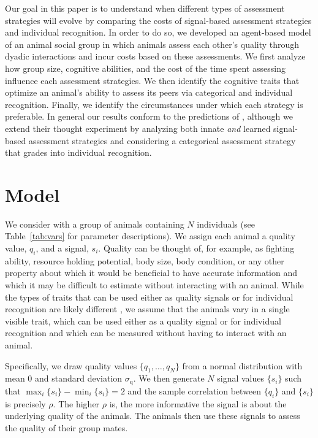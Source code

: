 Our goal in this paper is to understand when different types of assessment strategies will evolve by comparing the costs of signal-based assessment strategies and individual recognition.  In order to do so, we developed an agent-based model of an animal social group in which animals assess each other's quality through dyadic interactions and incur costs based on these assessments. We first analyze how group size, cognitive abilities, and the cost of the time spent assessing influence each assessment strategies. We then identify the cognitive traits that optimize an animal's ability to assess its peers via categorical and individual recognition. Finally, we identify the circumstances under which each strategy is preferable. In general our results conform to the predictions of \citet{sheehan2016evotradeoff}, although we extend their thought experiment by analyzing both innate \emph{and} learned signal-based assessment strategies and considering a categorical assessment strategy that grades into individual recognition. 
 

\section*{Model } 

We consider with a group of animals containing $N$ individuals (see Table~\ref{tab:vars} for parameter descriptions). We assign each animal a quality value, $q_i$, and a signal, $s_i$. Quality can be thought of, for example, as fighting ability, resource holding potential, body size, body condition, or any other property about which it would be beneficial to have accurate information and which it may be difficult to estimate without interacting with an animal. While the types of traits that can be used either as quality signals or for individual recognition are likely different \citep{Dale:2001dv}, we assume that the animals vary in a single visible trait, which can be used either as a quality signal or for individual recognition and which can be measured without having to interact with an animal.  

Specifically, we draw quality values $\{q_1,\dots,q_N\}$ from a normal distribution with mean $0$ and standard deviation $\sigma_\text{q}$. We then generate $N$ signal values $\{s_i\}$ such that 
$\max_i\{s_i\}-\min_i\{s_i\}=2$ and the sample correlation between $\{q_i\}$ and $\{s_i\}$ is precisely $\rho$. 
The higher $\rho$ is, the more informative the signal is about the underlying quality of the animals. The animals then use these signals to assess the quality of their group mates.

